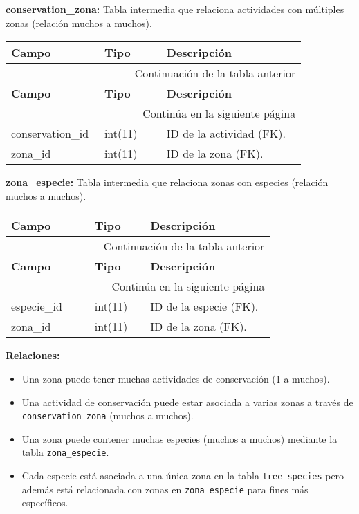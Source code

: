 \textbf{conservation\_zona:} Tabla intermedia que relaciona actividades con múltiples zonas (relación muchos a muchos).
\begin{longtable}{|p{0.3\linewidth}|p{0.2\linewidth}|p{0.45\linewidth}|}
\hline \textbf{Campo} & \textbf{Tipo} & \textbf{Descripción} \\ \hline 
\endfirsthead
\hline \multicolumn{3}{|r|}{{Continuación de la tabla anterior}} \\
\hline \textbf{Campo} & \textbf{Tipo} & \textbf{Descripción} \\ \hline 
\endhead
\hline \multicolumn{3}{|r|}{{Continúa en la siguiente página}} \\ 
\endfoot
\hline 
\endlastfoot
conservation\_id & int(11) & ID de la actividad (FK). \\ \hline
zona\_id & int(11) & ID de la zona (FK). \\ \hline
\end{longtable}

\textbf{zona\_especie:} Tabla intermedia que relaciona zonas con especies (relación muchos a muchos).
\begin{longtable}{|p{0.3\linewidth}|p{0.2\linewidth}|p{0.45\linewidth}|}
\hline \textbf{Campo} & \textbf{Tipo} & \textbf{Descripción} \\ \hline \endfirsthead
\hline \multicolumn{3}{|r|}{{Continuación de la tabla anterior}} \\
\hline \textbf{Campo} & \textbf{Tipo} & \textbf{Descripción} \\ \hline \endhead
\hline \multicolumn{3}{|r|}{{Continúa en la siguiente página}} \\ \endfoot
\hline \endlastfoot
especie\_id & int(11) & ID de la especie (FK). \\ \hline
zona\_id & int(11) & ID de la zona (FK). \\ \hline
\end{longtable}

\textbf{Relaciones:}
\begin{itemize}
    \item Una zona puede tener muchas actividades de conservación (1 a muchos).
    \item Una actividad de conservación puede estar asociada a varias zonas a través de \texttt{conservation\_zona} (muchos a muchos).
    \item Una zona puede contener muchas especies (muchos a muchos) mediante la tabla \texttt{zona\_especie}.
    \item Cada especie está asociada a una única zona en la tabla \texttt{tree\_species} pero además está relacionada con zonas en \texttt{zona\_especie} para fines más específicos.
\end{itemize}

